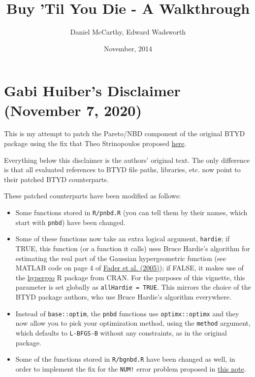 \documentclass[10pt, letterpaper, onecolumn, oneside, final]{article}\usepackage[]{graphicx}\usepackage[]{color}
\author{Daniel McCarthy, Edward Wadsworth}
\title{Buy 'Til You Die - A Walkthrough}
\date{November, 2014}
\begin{document}
\maketitle %

\section{Gabi Huiber's Disclaimer (November 7, 2020)}

This is my attempt to patch the 
Pareto/NBD component of the original BTYD package 
using the fix that Theo Strinopoulos proposed \href{https://github.com/theofilos/BTYD}{here}. 

Everything below this disclaimer is the authors' original text. The only 
difference is that all evaluated references to BTYD file paths, 
libraries, etc. now point to their patched BTYD counterparts. 

These patched counterparts have been modified as follows: 
\begin{itemize}
\item Some functions stored in \texttt{R/pnbd.R} (you can tell them by their names, 
which start with \texttt{pnbd}) have been changed. 
\item Some of these functions now take an extra logical argument, \texttt{hardie}; 
if TRUE, this function (or a function it calls) uses Bruce Hardie's 
algorithm for estimating the real part of the Gaussian hypergeometric 
function (see MATLAB code on page 4 of \href{http://brucehardie.com/notes/008/pareto_nbd_MATLAB.pdf}{Fader et al. (2005)}); 
if FALSE, it makes use of the 
\href{https://cran.r-project.org/web/packages/hypergeo/index.html}{hypergeo} R package from CRAN. 
For the purposes of this vignette, this parameter is set globally as \texttt{allHardie = TRUE}. This
mirrors the choice of the BTYD package authors, who use Bruce Hardie's algorithm everywhere.
\item Instead of \texttt{base::optim}, the \texttt{pnbd} functions use \texttt{optimx::optimx} and they 
now allow you to pick your optimization method, using the \texttt{method} argument, which defaults to \texttt{L-BFGS-B} without any constraints, as in the original package.
\item Some of the functions stored in \texttt{R/bgnbd.R} have been changed as well, in order to implement the fix for the \texttt{NUM!} error problem proposed in \href{http://www.brucehardie.com/notes/027/bgnbd_num_error.pdf}{this note}. 
\end{itemize}
\end{document}
